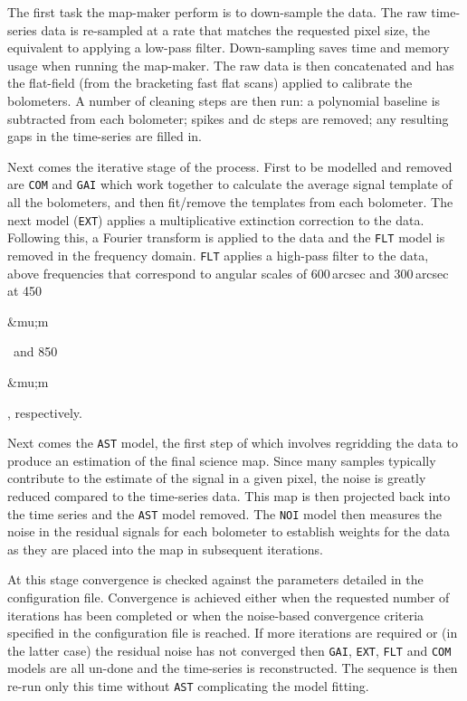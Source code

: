 \documentclass[twoside,11pt]{article}
\newcommand{\micron}{\mbox{\,${\umu}$m}}            %
\newcounter{box}
\renewcommand{\_}{\texttt{\symbol{95}}}
\renewcommand{\micron}{\begin{rawhtml}&mu;m\end{rawhtml}}
\begin{document}
The first task the map-maker perform is to down-sample the data. The raw time-series data is re-sampled at a rate that matches the requested pixel size, the equivalent to applying a low-pass filter. Down-sampling saves time and memory usage when running the map-maker. The raw data is then  concatenated and has the flat-field (from the bracketing fast flat scans) applied to calibrate the bolometers. A number of cleaning steps are then run: a polynomial baseline is subtracted from each bolometer; spikes and dc steps are removed; any resulting gaps in the time-series are filled in.

Next comes the iterative stage of the process. First to be modelled and removed are \texttt{COM} and \texttt{GAI} which work together to calculate the average signal template  of all the bolometers, and then fit/remove the templates from each  bolometer. The next model (\texttt{EXT}) applies a multiplicative extinction correction to the data.  Following this, a Fourier transform is applied to the data and the  \texttt{FLT} model is removed in the frequency domain.  \texttt{FLT} applies a high-pass filter to the data, above frequencies that correspond to angular scales of 600\,arcsec and 300\,arcsec at  450\micron\ and 850\micron, respectively.

Next comes the \texttt{AST} model, the first step of which involves regridding the data to produce an estimation of the final science map. Since many samples typically contribute to the estimate of the signal in a given pixel, the noise is greatly reduced compared to the time-series data. This map is then projected back into the time series and the  \texttt{AST} model removed. The \texttt{NOI} model then  measures the noise in the residual signals for each bolometer to  establish weights for the data as they are placed into the map in   subsequent iterations.

At this stage convergence is checked against the parameters detailed in the configuration file.  Convergence is achieved either when the requested number of iterations has been completed or when the noise-based convergence criteria  specified in the configuration file is reached. If more iterations are required or (in the latter case) the residual noise has not converged then \texttt{GAI}, \texttt{EXT}, \texttt{FLT} and \texttt{COM} models are all un-done and the time-series is reconstructed. The sequence is then re-run only this time without  \texttt{AST} complicating the model fitting. 
\end{document}
